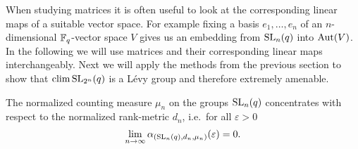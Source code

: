 When studying matrices it is often useful to look at the corresponding linear maps of a suitable vector space. 
For example fixing a basis $e_1,\dots,e_n$ of an $n$-dimensional $\mathbb{F}_q$-vector space $V$ gives us an embedding from $\operatorname{SL}_n(q)$ into $\operatorname{Aut}(V)$. In the following we will use matrices and their corresponding linear maps interchangeably.
Next we will apply the methods from the previous section to show that $\operatorname{clim} \operatorname{SL}_{2^n}(q)$ is a L\'evy group and therefore extremely amenable.

\begin{theorem}\label{thm:SLConcentrates}
	The normalized counting measure $\mu_n$ on the groups $\operatorname{SL}_{n}(q)$ concentrates with respect to the normalized rank-metric $d_n$, i.e.\ for all $\varepsilon>0$
	\[\lim_{n\to\infty} \alpha_{(\operatorname{SL}_{n}(q), d_n, \mu_n)}(\varepsilon)=0 .\]
\end{theorem}
